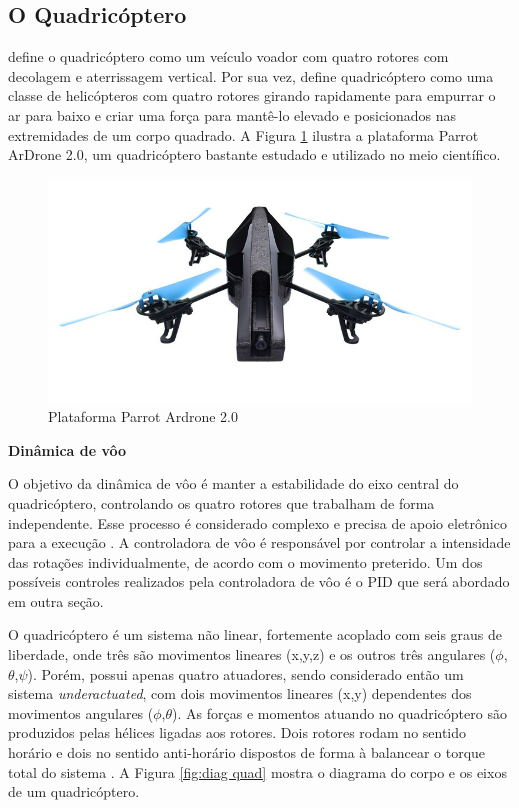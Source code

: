 \documentclass[a4paper, 12pt]{article}
\begin{document}
\subsection{O Quadricóptero}

\cite{Salih2010} define o quadricóptero como um veículo voador com quatro rotores com decolagem e aterrissagem vertical. Por sua vez, \cite{Gibiansky2010} define quadricóptero como uma classe de helicópteros com quatro rotores girando rapidamente para empurrar o ar para baixo e criar uma força para mantê-lo elevado e posicionados nas extremidades de um corpo quadrado. A Figura \ref{fig:quad} ilustra a plataforma Parrot ArDrone 2.0, um quadricóptero bastante estudado e utilizado no meio científico.

\begin{figure}[h]
	\centering
		\includegraphics[scale=0.4]{img/parrot_drone.jpg}
	\caption{Plataforma Parrot Ardrone 2.0}
	\label{fig:quad}
\end{figure}

\noindent\textbf{Dinâmica de vôo}

O objetivo da dinâmica de vôo é manter a estabilidade do eixo central do quadricóptero,  controlando os quatro rotores que trabalham de forma independente. Esse processo é considerado complexo e precisa de apoio eletrônico para a execução \cite{Gibiansky2010}. A controladora de vôo é responsável por controlar a intensidade das rotações individualmente, de acordo com o movimento preterido. Um dos possíveis controles realizados pela controladora de vôo é o PID que será abordado em outra seção.

O quadricóptero é um sistema não linear, fortemente acoplado com seis graus de liberdade, onde três são movimentos lineares (x,y,z) e os outros três angulares ($\phi$,$\theta$,$\psi$). Porém, possui apenas quatro atuadores, sendo considerado então um sistema \textit{underactuated}, com dois movimentos lineares (x,y) dependentes dos movimentos angulares ($\phi$,$\theta$). As forças e momentos atuando no quadricóptero são produzidos pelas hélices ligadas aos rotores. Dois rotores rodam no sentido horário e dois no sentido anti-horário dispostos de forma à balancear o torque total do sistema \cite{Mian2008}. A Figura \ref{fig:diag quad} mostra o diagrama do corpo e os eixos de um quadricóptero.
\end{document}
